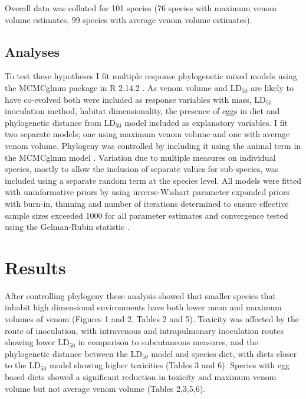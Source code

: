 Overall data was collated for 101 species (76 species with maximum venom volume estimates, 99 species with average venom volume estimates).


\subsection{Analyses}

To test these hypotheses I fit multiple response phylogenetic mixed models using the MCMCglmm package \citep{hadfield2010mcmc} in R 2.14.2 \citep{RCran}. As venom volume and LD$_{50}$ are likely to have co-evolved both were included as response variables with mass, LD$_{50}$ inoculation method, habitat dimensionality, the presence of eggs in diet and phylogenetic distance from LD$_{50}$ model included as explanatory variables. I fit two separate models; one using maximum venom volume and one with average venom volume. Phylogeny was controlled by including it using the animal term in the MCMCglmm model \citep{hadfield2010mcmc}. Variation due to multiple measures on individual species, mostly to allow the inclusion of separate values for sub-species, was included using a separate random term at the species level. All models were fitted with uninformative priors by using inverse-Wishart parameter expanded priors \citep{hadfield2010mcmc} with burn-in, thinning and number of iterations determined to ensure effective sample sizes exceeded 1000 for all parameter estimates and convergence tested using the Gelman-Rubin statistic \citep{gelman1992inference}. 

\section{Results}

After controlling phylogeny these analysis showed that smaller species that inhabit high dimensional environments have both lower mean and maximum volumes of venom (Figures 1 and 2, Tables 2 and 5). Toxicity was affected by the route of inoculation, with intravenous and intrapulmonary inoculation routes showing lower LD$_{50}$ in comparison to subcutaneous measures, and the phylogenetic distance between the LD$_{50}$ model and species diet, with diets closer to the LD$_{50}$ model showing higher toxicities (Tables 3 and 6). Species with egg based diets showed a significant reduction in toxicity and maximum venom volume but not average venom volume (Tables 2,3,5,6).




